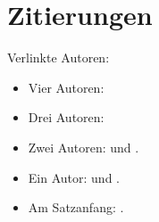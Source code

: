 \documentclass[ngerman]{scrbook}
\begin{document}
\chapter{Zitierungen}
Verlinkte Autoren:

\begin{itemize}
  \item Vier Autoren: \citeauthor{ABCD02} \cite{ABCD02}
  \item Drei Autoren: \citeauthor{ABC01} \cite{ABC01}
  \item Zwei Autoren: \citeauthor{AB00} \cite{AB00} und \citeauthor{vdAW2013} \cite{vdAW2013}.
  \item Ein Autor: \citeauthor{Ez10} \cite{Ez10} und \citeauthor{Go10} \cite{Go10}.
  \item Am Satzanfang: .
\end{itemize}

\nocite{*}
\printbibliography
\end{document}
